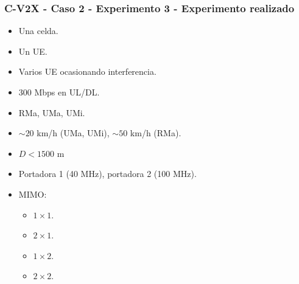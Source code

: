\documentclass{beamer}
\begin{document}
\begin{frame}
\frametitle{C-V2X - Caso 2 - Experimento 3 - Experimento realizado}

\begin{itemize}
\item Una celda.
\item Un UE.
\item Varios UE ocasionando interferencia.
\item 300 Mbps en UL/DL.
\item RMa, UMa, UMi.
\item $\sim 20$ km/h (UMa, UMi), $\sim 50$ km/h (RMa).
\item $D < 1500$ m
\item Portadora 1 (40 MHz), portadora 2 (100 MHz).
\item {
	MIMO:
	\begin{itemize}
	\item $1 \times 1$.
	\item $2 \times 1$.
	\item $1 \times 2$.
	\item $2 \times 2$.
	\end{itemize}
}
\end{itemize}
\end{frame}
\end{document}
